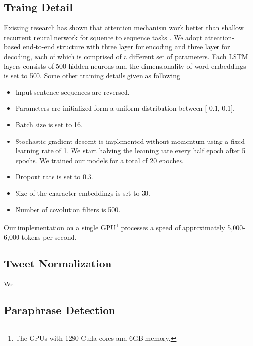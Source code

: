 \documentclass[letterpaper]{article}
\begin{document}
\subsection{Traing Detail}
Existing research has shown that attention mechanism work better than shallow recurrent neural network for squence to sequence tasks \cite{luong-pham-manning:2015:EMNLP,Sutskever:2014:SSL:2969033.2969173}. We adopt attention-based end-to-end structure with three layer for encoding and three layer for decoding, each of which is comprised of a different set of parameters. Each LSTM layers consists of 500 hidden neurons and the dimensionality of word embeddings is set to 500. Some other training details given as following.

\begin{itemize}	
	\item Input sentence sequences are reversed.
	\item Parameters are initialized form a uniform distribution between [-0.1, 0.1].
	\item Batch size is set to 16.
	\item Stochastic gradient descent is implemented without momentum using a fixed learning rate of 1. We start halving the learning rate every half epoch after 5 epochs. We trained our models for a total of 20 epoches.
	\item Dropout rate is set to 0.3.
	\item Size of the character embeddings is set to 30.
	\item Number of covolution filters is 500.
\end{itemize}

Our implementation on a single GPU\footnote{The GPUs with 1280 Cuda cores and 6GB memory.} processes a speed of approximately 5,000-6,000 tokens per second.

\subsection{Tweet Normalization}
We 

\subsection{Paraphrase Detection}
\end{document}
